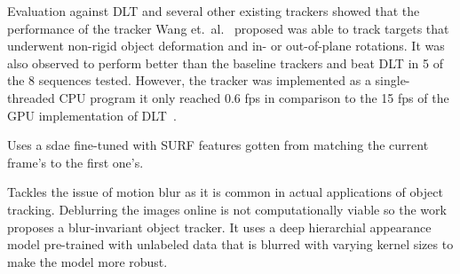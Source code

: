 Evaluation against DLT and several other existing trackers showed that the performance
of the tracker Wang et.~al.~\cite{LEARNED_HIERARCH} proposed was able to track targets
that underwent non-rigid object deformation and in- or out-of-plane rotations. It was
also observed to perform better than the baseline trackers and beat DLT in 5 of the 8
sequences tested. However, the tracker was implemented as a single-threaded CPU program
it only reached 0.6 fps in comparison to the 15 fps of the GPU implementation of
DLT~\cite{LEARNING_DEEP}.

\cite{SMS_DLT}
Uses a \ac{sdae} fine-tuned with SURF features gotten from matching the current frame's
to the first one's.

\cite{BLUR_TRACK}
Tackles the issue of motion blur as it is common in actual applications of object
tracking. Deblurring the images online is not computationally viable so the work
proposes a blur-invariant object tracker. It uses a deep hierarchial appearance
model pre-trained with unlabeled data that is blurred with varying kernel sizes
to make the model more robust. 